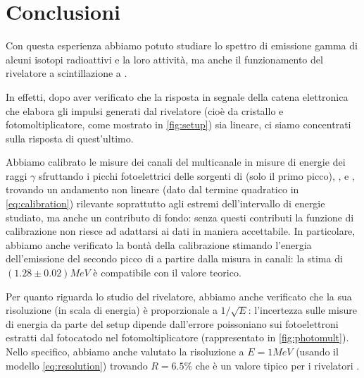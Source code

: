 \section{Conclusioni}

Con questa esperienza abbiamo potuto studiare lo spettro di emissione gamma di alcuni isotopi radioattivi e la loro attività, ma anche il funzionamento del rivelatore a scintillazione a .

In effetti, dopo aver verificato che la risposta in segnale della catena elettronica che elabora gli impulsi generati dal rivelatore (cioè da cristallo e fotomoltiplicatore, come mostrato in \cref{fig:setup}) sia lineare, ci siamo concentrati sulla risposta di quest'ultimo.

Abbiamo calibrato le misure dei canali del multicanale in misure di energie dei raggi $ \gamma $ sfruttando i picchi fotoelettrici delle sorgenti di  (solo il primo picco), ,  e , trovando un andamento non lineare (dato dal termine quadratico in \cref{eq:calibration}) rilevante soprattutto agli estremi dell'intervallo di energie studiato, ma anche un contributo di fondo: senza questi contributi la funzione di calibrazione non riesce ad adattarsi ai dati in maniera accettabile.
In particolare, abbiamo anche verificato la bontà della calibrazione stimando l'energia dell'emissione del secondo picco di  a partire dalla misura in canali: la stima di $ (1.28 \pm 0.02) \unit{MeV} $ è compatibile con il valore teorico.

Per quanto riguarda lo studio del rivelatore, abbiamo anche verificato che la sua risoluzione (in scala di energia) è proporzionale a $ 1 / \sqrt{E} $: l'incertezza sulle misure di energia da parte del setup dipende dall'errore poissoniano sui fotoelettroni estratti dal fotocatodo nel fotomoltiplicatore (rappresentato in \cref{fig:photomult}).
Nello specifico, abbiamo anche valutato la risoluzione a $ E = 1 \unit{MeV} $ (usando il modello \cref{eq:resolution}) trovando $ R = 6.5 \% $ che è un valore tipico per i rivelatori .

